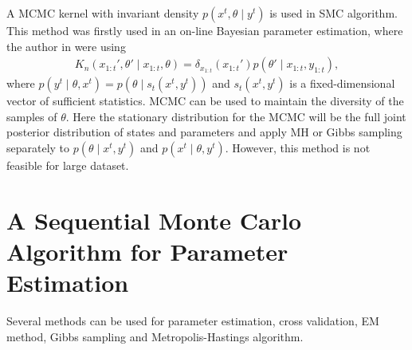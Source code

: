 A MCMC kernel with invariant density $p(x^t,\theta\mid y^t)$ is used in SMC algorithm. This method was firstly used in an on-line Bayesian parameter estimation, where the author in \cite{andrieu1999sequential} were using
\begin{align*}
K_n(x_{1:t}',\theta'\mid x_{1:t},\theta) = \delta_{x_{1:t}}(x_{1:t} ')p(\theta'\mid x_{1:t},y_{1:t}),
\end{align*}
where $p(y^t\mid\theta,x^t)=p(\theta\mid s_t(x^t,y^t))$ and $s_t(x^t,y^t)$ is a fixed-dimensional vector of sufficient statistics. MCMC can be used to maintain the diversity of the samples of $\theta$. Here the stationary distribution for the MCMC will be the full joint posterior distribution of states and parameters and apply MH or Gibbs sampling separately to $p(\theta \mid x^t,y^t)$ and $p(x^t \mid \theta,y^t)$. However, this method is not feasible for large dataset. 


\section{A Sequential Monte Carlo Algorithm for Parameter Estimation}
Several methods can be used for parameter estimation, cross validation, EM method, Gibbs sampling and  Metropolis-Hastings algorithm. 

